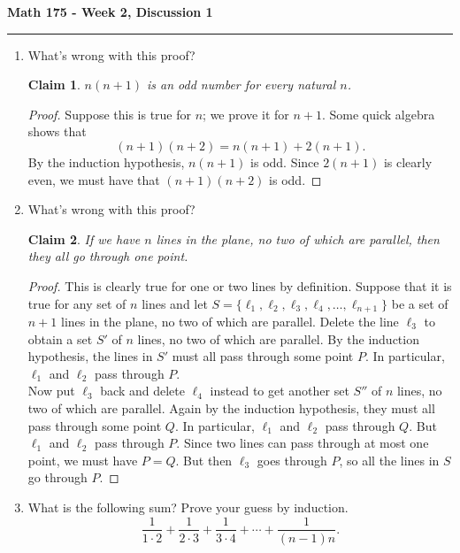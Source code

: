 \documentclass[11pt,letterpaper]{report}
\newtheorem*{claim*}{Claim}
\begin{document}
\begin{center}
{\bf \Large Math 175 - Week 2, Discussion 1}
\vspace{0.2cm}
\hrule
\end{center}

\begin{enumerate}

	\item What's wrong with this proof?
	\begin{claim*}
		$n(n+1)$ is an odd number for every natural $n$.
	\end{claim*}
	\begin{proof}
		Suppose this is true for $n$; we prove it for $n+1$. Some quick algebra shows that
		\[
		(n+1)(n+2) = n(n+1) + 2(n+1).
		\]
		By the induction hypothesis, $n(n+1)$ is odd. Since $2(n+1)$ is clearly even, we must have that $(n+1)(n+2)$ is odd.
	\end{proof}
	\vfill

	\item What's wrong with this proof?
	\begin{claim*}
		If we have $n$ lines in the plane, no two of which are parallel, then they all go through one point.
	\end{claim*}
	\begin{proof}
		This is clearly true for one or two lines by definition. Suppose that it is true for any set of $n$ lines and let $S = \{\ell_1, \ell_2, \ell_3, \ell_4,  \ldots, \ell_{n+1}\}$ be a set of $n+1$ lines in the plane, no two of which are parallel. Delete the line $\ell_3$ to obtain a set $S'$ of $n$ lines, no two of which are parallel. By the induction hypothesis, the lines in $S'$ must all pass through some point $P$. In particular, $\ell_1$ and $\ell_2$ pass through $P$.\\

		\noindent Now put $\ell_3$ back and delete $\ell_4$ instead to get another set $S''$ of $n$ lines, no two of which are parallel. Again by the induction hypothesis, they must all pass through some point $Q$. In particular, $\ell_1$ and $\ell_2$ pass through $Q$. But $\ell_1$ and $\ell_2$ pass through $P$. Since two lines can pass through at most one point, we must have $P = Q$. But then $\ell_3$ goes through $P$, so all the lines in $S$ go through $P$.
	\end{proof}

	\vfill

	\item What is the following sum? Prove your guess by induction.
	\[
	\frac{1}{1\cdot 2} + \frac{1}{2\cdot 3} + \frac{1}{3\cdot 4} + \cdots + \frac{1}{(n-1)n}.
	\]


\end{enumerate}
\end{document}

